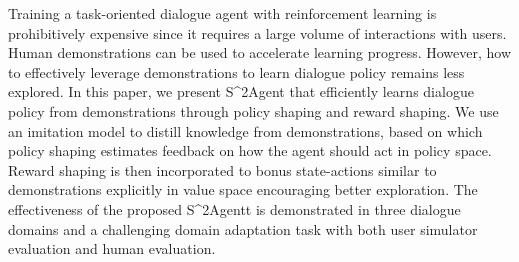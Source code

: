 Training a task-oriented dialogue agent with reinforcement learning is prohibitively expensive since it requires a large volume of interactions with users. Human demonstrations can be used to accelerate learning progress. However, how to effectively leverage demonstrations to learn dialogue policy remains less explored. In this paper, we present S^2Agent that efficiently learns dialogue policy from demonstrations through policy shaping and reward shaping. We use an imitation model to distill knowledge from demonstrations, based on which policy shaping estimates feedback on how the agent should act in policy space. Reward shaping is then incorporated to bonus state-actions similar to demonstrations explicitly in value space encouraging better exploration. The effectiveness of the proposed S^2Agentt is demonstrated in three dialogue domains and a challenging domain adaptation task with both user simulator evaluation and human evaluation.
